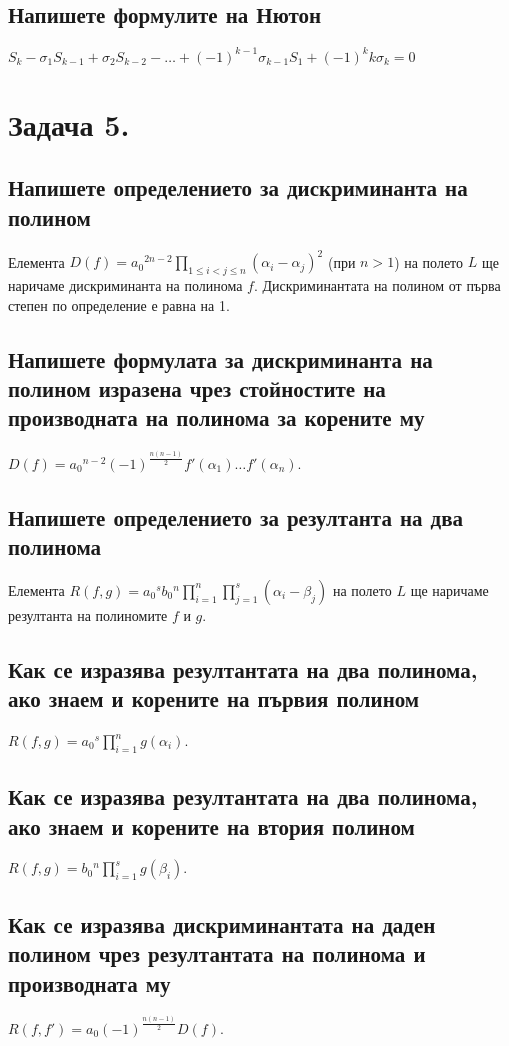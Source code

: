 \documentclass[10pt]{article}
\begin{document}
\subsection*{Напишете формулите на Нютон}
$S_k - \sigma_1S_{k-1} + \sigma_2S_{k-2} - \ldots + (-1)^{k-1}\sigma_{k-1}S_1 + (-1)^kk\sigma_k = 0$

\section*{Задача 5.}

\subsection*{Напишете определението за дискриминанта на полином}
Елемента $D(f) = a_0{}^{2n-2}\prod_{1 \leq i < j \leq n}^{}(\alpha_i - \alpha_j)^2$ (при $n > 1$) на полето $L$ ще наричаме дискриминанта на полинома $f$. Дискриминантата на полином от първа степен по определение е равна на 1.

\subsection*{Напишете формулата за дискриминанта на полином изразена чрез стойностите на производната на полинома за корените му}
$D(f) = a_0{}^{n-2}(-1)^{\frac{n(n - 1)}{2}}f'(\alpha_1) \ldots f'(\alpha_n)$.

\subsection*{Напишете определението за резултанта на два полинома}
Елемента $R(f,g) = a_0{}^sb_0{}^n\prod_{i=1}^{n}\prod_{j=1}^{s}(\alpha_i - \beta_j)$ на полето $L$ ще наричаме резултанта на полиномите $f$ и $g$.

\subsection*{Как се изразява резултантата на два полинома, ако знаем и корените на първия полином}
$R(f,g) = a_0{}^s\prod_{i=1}^{n}g(\alpha_i)$.

\subsection*{Как се изразява резултантата на два полинома, ако знаем и корените на втория полином}
$R(f,g) = b_0{}^n\prod_{i=1}^{s}g(\beta_i)$.

\subsection*{Как се изразява дискриминантата на даден полином чрез резултантата на полинома и производната му}
$R(f, f') = a_0(-1)^{\frac{n(n-1)}{2}}D(f)$.
\end{document}
